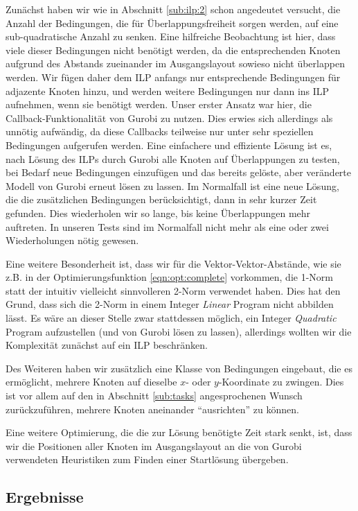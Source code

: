 Zunächst haben wir wie in Abschnitt \ref{sub:ilp:2} schon angedeutet versucht, die Anzahl der Bedingungen, die für Überlappungsfreiheit sorgen werden, auf eine sub-quadratische Anzahl zu senken. Eine hilfreiche Beobachtung ist hier, dass viele dieser Bedingungen nicht benötigt werden, da die entsprechenden Knoten aufgrund des Abstands zueinander im Ausgangslayout sowieso nicht überlappen werden. Wir fügen daher dem ILP anfangs nur entsprechende Bedingungen für adjazente Knoten hinzu, und werden weitere Bedingungen nur dann ins ILP aufnehmen, wenn sie benötigt werden. Unser erster Ansatz war hier, die Callback-Funktionalität von Gurobi zu nutzen. Dies erwies sich allerdings als unnötig aufwändig, da diese Callbacks teilweise nur unter sehr speziellen Bedingungen aufgerufen werden. Eine einfachere und effiziente Lösung ist es, nach Lösung des ILPs durch Gurobi alle Knoten auf Überlappungen zu testen, bei Bedarf neue Bedingungen einzufügen und das bereits gelöste, aber veränderte Modell von Gurobi erneut lösen zu lassen. Im Normalfall ist eine neue Lösung, die die zusätzlichen Bedingungen berücksichtigt, dann in sehr kurzer Zeit gefunden. Dies wiederholen wir so lange, bis keine Überlappungen mehr auftreten. In unseren Tests sind im Normalfall nicht mehr als eine oder zwei Wiederholungen nötig gewesen.

Eine weitere Besonderheit ist, dass wir für die Vektor-Vektor-Abstände, wie sie z.B. in der Optimierungsfunktion \ref{eqn:opt:complete} vorkommen, die 1-Norm statt der intuitiv vielleicht sinnvolleren 2-Norm verwendet haben. Dies hat den Grund, dass sich die 2-Norm in einem Integer \textit{Linear} Program nicht abbilden lässt. Es wäre an dieser Stelle zwar stattdessen möglich, ein Integer \textit{Quadratic} Program aufzustellen (und von Gurobi lösen zu lassen), allerdings wollten wir die Komplexität zunächst auf ein ILP beschränken.

Des Weiteren haben wir zusätzlich eine Klasse von Bedingungen eingebaut, die es ermöglicht, mehrere Knoten auf dieselbe $x$- oder $y$-Koordinate zu zwingen. Dies ist vor allem auf den in Abschnitt \ref{sub:tasks} angesprochenen Wunsch zurückzuführen, mehrere Knoten aneinander "`ausrichten"' zu können.

Eine weitere Optimierung, die die zur Lösung benötigte Zeit stark senkt, ist, dass wir die Positionen aller Knoten im Ausgangslayout an die von Gurobi verwendeten Heuristiken zum Finden einer Startlösung übergeben.

\subsection{Ergebnisse}

